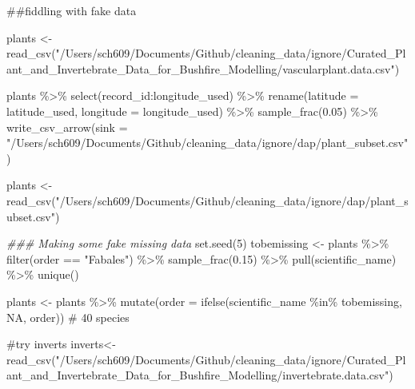 \documentclass[
  letterpaper,
  DIV=11,
  numbers=noendperiod,
  oneside]{scrreprt}
\newenvironment{Shaded}{\begin{snugshade}}{\end{snugshade}}
\newcommand{\AttributeTok}[1]{\textcolor[rgb]{0.40,0.45,0.13}{#1}}
\newcommand{\CommentTok}[1]{\textcolor[rgb]{0.37,0.37,0.37}{#1}}
\newcommand{\ConstantTok}[1]{\textcolor[rgb]{0.56,0.35,0.01}{#1}}
\newcommand{\DecValTok}[1]{\textcolor[rgb]{0.68,0.00,0.00}{#1}}
\newcommand{\DocumentationTok}[1]{\textcolor[rgb]{0.37,0.37,0.37}{\textit{#1}}}
\newcommand{\FloatTok}[1]{\textcolor[rgb]{0.68,0.00,0.00}{#1}}
\newcommand{\FunctionTok}[1]{\textcolor[rgb]{0.28,0.35,0.67}{#1}}
\newcommand{\NormalTok}[1]{\textcolor[rgb]{0.00,0.23,0.31}{#1}}
\newcommand{\OtherTok}[1]{\textcolor[rgb]{0.00,0.23,0.31}{#1}}
\newcommand{\SpecialCharTok}[1]{\textcolor[rgb]{0.37,0.37,0.37}{#1}}
\newcommand{\StringTok}[1]{\textcolor[rgb]{0.13,0.47,0.30}{#1}}
\begin{document}
\#\#fiddling with fake data

\begin{Shaded}
\begin{Highlighting}[]
\NormalTok{plants }\OtherTok{\textless{}{-}} \FunctionTok{read\_csv}\NormalTok{(}\StringTok{"/Users/sch609/Documents/Github/cleaning\_data/ignore/Curated\_Plant\_and\_Invertebrate\_Data\_for\_Bushfire\_Modelling/vascularplant.data.csv"}\NormalTok{)}


\NormalTok{plants }\SpecialCharTok{\%\textgreater{}\%}
  \FunctionTok{select}\NormalTok{(record\_id}\SpecialCharTok{:}\NormalTok{longitude\_used) }\SpecialCharTok{\%\textgreater{}\%}
  \FunctionTok{rename}\NormalTok{(}\AttributeTok{latitude =}\NormalTok{ latitude\_used,}
         \AttributeTok{longitude =}\NormalTok{ longitude\_used) }\SpecialCharTok{\%\textgreater{}\%}
  \FunctionTok{sample\_frac}\NormalTok{(}\FloatTok{0.05}\NormalTok{) }\SpecialCharTok{\%\textgreater{}\%}
  \FunctionTok{write\_csv\_arrow}\NormalTok{(}\AttributeTok{sink =} \StringTok{"/Users/sch609/Documents/Github/cleaning\_data/ignore/dap/plant\_subset.csv"}\NormalTok{)}

\NormalTok{plants }\OtherTok{\textless{}{-}} \FunctionTok{read\_csv}\NormalTok{(}\StringTok{"/Users/sch609/Documents/Github/cleaning\_data/ignore/dap/plant\_subset.csv"}\NormalTok{)}

\DocumentationTok{\#\#\# Making some fake missing data}
\FunctionTok{set.seed}\NormalTok{(}\DecValTok{5}\NormalTok{)}
\NormalTok{tobemissing }\OtherTok{\textless{}{-}}\NormalTok{ plants }\SpecialCharTok{\%\textgreater{}\%}
  \FunctionTok{filter}\NormalTok{(order }\SpecialCharTok{==} \StringTok{"Fabales"}\NormalTok{) }\SpecialCharTok{\%\textgreater{}\%}
  \FunctionTok{sample\_frac}\NormalTok{(}\FloatTok{0.15}\NormalTok{) }\SpecialCharTok{\%\textgreater{}\%}
  \FunctionTok{pull}\NormalTok{(scientific\_name) }\SpecialCharTok{\%\textgreater{}\%}
  \FunctionTok{unique}\NormalTok{()}

\NormalTok{plants }\OtherTok{\textless{}{-}}\NormalTok{ plants }\SpecialCharTok{\%\textgreater{}\%}
  \FunctionTok{mutate}\NormalTok{(}\AttributeTok{order =} \FunctionTok{ifelse}\NormalTok{(scientific\_name }\SpecialCharTok{\%in\%}\NormalTok{ tobemissing, }\ConstantTok{NA}\NormalTok{, order)) }\CommentTok{\# 40 species}

\CommentTok{\#try inverts }
\NormalTok{inverts}\OtherTok{\textless{}{-}}\FunctionTok{read\_csv}\NormalTok{(}\StringTok{"/Users/sch609/Documents/Github/cleaning\_data/ignore/Curated\_Plant\_and\_Invertebrate\_Data\_for\_Bushfire\_Modelling/invertebrate.data.csv"}\NormalTok{)}



\end{Highlighting}
\end{Shaded}
\end{document}
